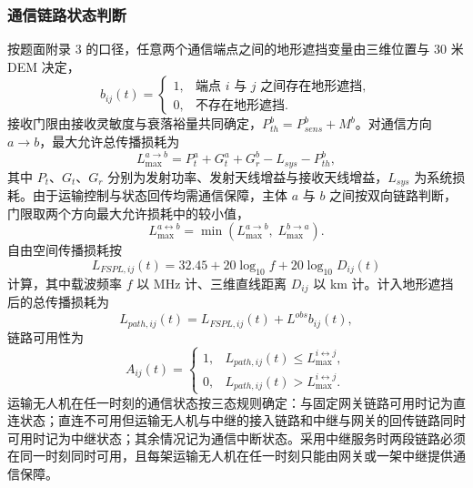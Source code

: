 \documentclass[bwprint]{gmcmthesis}
\begin{document}
\subsubsection{通信链路状态判断}
按题面附录 3 的口径，任意两个通信端点之间的地形遮挡变量由三维位置与 30 米 DEM 决定，
\begin{equation}
b_{ij}(t)=
\begin{cases}
1, & \text{端点 }i\text{ 与 }j\text{ 之间存在地形遮挡},\\
0, & \text{不存在地形遮挡}.
\end{cases}
\label{eq:block}
\end{equation}
接收门限由接收灵敏度与衰落裕量共同确定，$P_{th}^{b}=P_{sens}^{b}+M^{b}$。对通信方向 $a\to b$，最大允许总传播损耗为
\begin{equation}
L_{\max}^{a\to b}=P_t^{a}+G_t^{a}+G_r^{b}-L_{sys}-P_{th}^{b},
\label{eq:linkbudget}
\end{equation}
其中 $P_t$、$G_t$、$G_r$ 分别为发射功率、发射天线增益与接收天线增益，$L_{sys}$ 为系统损耗。由于运输控制与状态回传均需通信保障，主体 $a$ 与 $b$ 之间按双向链路判断，门限取两个方向最大允许损耗中的较小值，
\begin{equation}
L_{\max}^{a\leftrightarrow b}=\min\left(L_{\max}^{a\to b},\;L_{\max}^{b\to a}\right).
\label{eq:bidir}
\end{equation}
自由空间传播损耗按
\begin{equation}
L_{FSPL,ij}(t)=32.45+20\log_{10}f+20\log_{10}D_{ij}(t)
\label{eq:fspl}
\end{equation}
计算，其中载波频率 $f$ 以 MHz 计、三维直线距离 $D_{ij}$ 以 km 计。计入地形遮挡后的总传播损耗为
\begin{equation}
L_{path,ij}(t)=L_{FSPL,ij}(t)+L^{obs}b_{ij}(t),
\label{eq:pathloss}
\end{equation}
链路可用性为
\begin{equation}
A_{ij}(t)=
\begin{cases}
1, & L_{path,ij}(t)\le L_{\max}^{i\leftrightarrow j},\\
0, & L_{path,ij}(t)>L_{\max}^{i\leftrightarrow j}.
\end{cases}
\label{eq:avail}
\end{equation}
运输无人机在任一时刻的通信状态按三态规则确定：与固定网关链路可用时记为直连状态；直连不可用但运输无人机与中继的接入链路和中继与网关的回传链路同时可用时记为中继状态；其余情况记为通信中断状态。采用中继服务时两段链路必须在同一时刻同时可用，且每架运输无人机在任一时刻只能由网关或一架中继提供通信保障。
\end{document}
